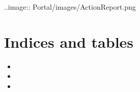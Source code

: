 \documentclass[letterpaper,10pt,english]{sphinxmanual}
\begin{document}
..image:: Portal/images/ActionReport.png


\chapter{Indices and tables}
\label{\detokenize{index:indices-and-tables}}\begin{itemize}
\item {} 

\item {} 

\item {} 

\end{itemize}



\renewcommand{\indexname}{Index}
\printindex
\end{document}
